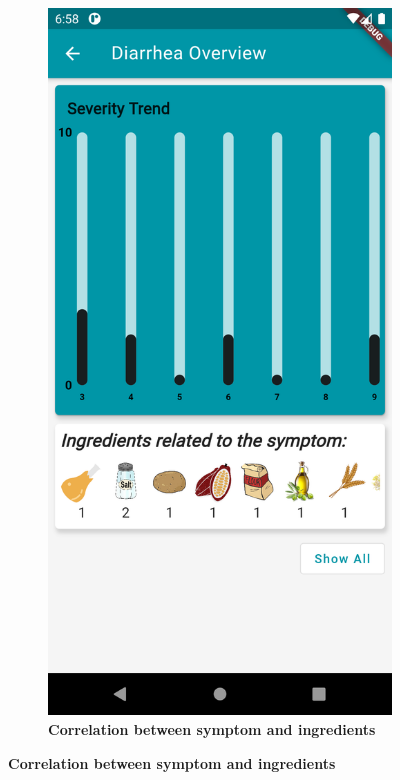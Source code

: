 \documentclass [12pt]{article}
\begin{document}
\begin{description}[leftmargin=1cm,rightmargin=1cm]
\begin{figure}[h!]
\begin{subfigure}[tr]{0.3\linewidth}
\includegraphics[width=\linewidth]{statistics3.PNG}
\caption{\textbf{Correlation between symptom and ingredients}}

\end{subfigure}
\end{figure}
\end{description}
\end{document}
